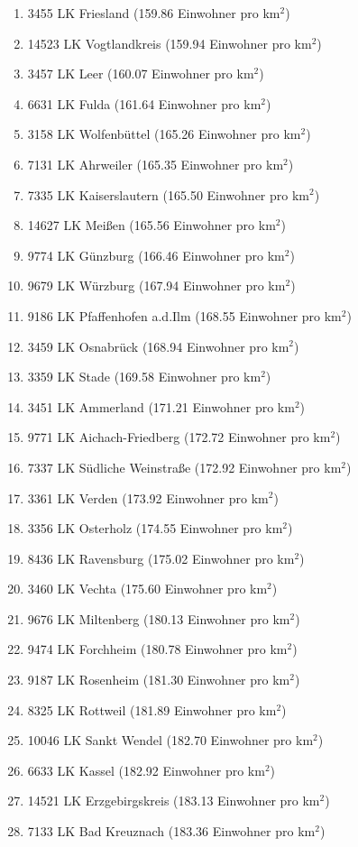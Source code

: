 \begin{enumerate}[itemsep=-6mm]
\item 3455 LK Friesland (159.86 Einwohner pro km$^2$)
\item 14523 LK Vogtlandkreis (159.94 Einwohner pro km$^2$)
\item 3457 LK Leer (160.07 Einwohner pro km$^2$)
\item 6631 LK Fulda (161.64 Einwohner pro km$^2$)
\item 3158 LK Wolfenbüttel (165.26 Einwohner pro km$^2$)
\item 7131 LK Ahrweiler (165.35 Einwohner pro km$^2$)
\item 7335 LK Kaiserslautern (165.50 Einwohner pro km$^2$)
\item 14627 LK Meißen (165.56 Einwohner pro km$^2$)
\item 9774 LK Günzburg (166.46 Einwohner pro km$^2$)
\item 9679 LK Würzburg (167.94 Einwohner pro km$^2$)
\item 9186 LK Pfaffenhofen a.d.Ilm (168.55 Einwohner pro km$^2$)
\item 3459 LK Osnabrück (168.94 Einwohner pro km$^2$)
\item 3359 LK Stade (169.58 Einwohner pro km$^2$)
\item 3451 LK Ammerland (171.21 Einwohner pro km$^2$)
\item 9771 LK Aichach-Friedberg (172.72 Einwohner pro km$^2$)
\item 7337 LK Südliche Weinstraße (172.92 Einwohner pro km$^2$)
\item 3361 LK Verden (173.92 Einwohner pro km$^2$)
\item 3356 LK Osterholz (174.55 Einwohner pro km$^2$)
\item 8436 LK Ravensburg (175.02 Einwohner pro km$^2$)
\item 3460 LK Vechta (175.60 Einwohner pro km$^2$)
\item 9676 LK Miltenberg (180.13 Einwohner pro km$^2$)
\item 9474 LK Forchheim (180.78 Einwohner pro km$^2$)
\item 9187 LK Rosenheim (181.30 Einwohner pro km$^2$)
\item 8325 LK Rottweil (181.89 Einwohner pro km$^2$)
\item 10046 LK Sankt Wendel (182.70 Einwohner pro km$^2$)
\item 6633 LK Kassel (182.92 Einwohner pro km$^2$)
\item 14521 LK Erzgebirgskreis (183.13 Einwohner pro km$^2$)
\item 7133 LK Bad Kreuznach (183.36 Einwohner pro km$^2$)

\end{enumerate}
